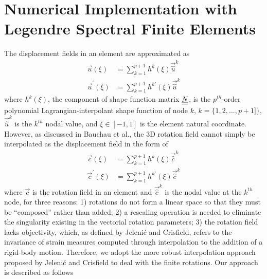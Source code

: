 \section{Numerical Implementation with Legendre Spectral Finite Elements}
The displacement fields in an element are approximated as
\begin{align}
    \label{InterpolateDisp}
    \vec{u}(\xi) &= \sum_{k=1}^{p+1} h^k(\xi) \vec{\hat{u}}^k \\
    \label{InterpolateDispp}
    \vec{u}^\prime(\xi) &= \sum_{k=1}^{p+1} h^{k\prime}(\xi) \vec{\hat{u}}^k
\end{align}
where $h^k(\xi)$, the component of shape function matrix $\underline{\underline{N}}$, is the $p^{th}$-order polynomial
Lagrangian-interpolant shape function of node $k$, $k=\{1,2,...,p+1]\}$, 
$\vec{\hat{u}}^k$ is
the $k^{th}$ nodal value, and $\xi \in \left[-1,1\right]$ is the element
natural coordinate.
However, as discussed in Bauchau et al.\cite{Bauchau-etal:2008}, the 
3D rotation field cannot simply be interpolated as the displacement field in the form of
\begin{align}
    \label{InterpolateRot}
    \vec{c}(\xi) &= \sum_{k=1}^{p+1} h^k(\xi) \vec{\hat{c}}^k \\
    \label{InterpolateRotp}
    \vec{c}^\prime(\xi) &= \sum_{k=1}^{p+1} h^{k \prime}(\xi) \vec{\hat{c}}^k 
\end{align}    
where $\vec{c}$ is the rotation field in an element and $\vec{\hat{c}}^k$ is
the nodal value at the $k^{th}$ node, for three reasons: 1) rotations do not
form a linear space so that they must be  ``composed'' rather than added; 2)
a rescaling operation is needed to eliminate the singularity existing in the
vectorial rotation parameters; 3) the rotation field lacks objectivity,
which, as
defined by Jeleni\'c and Crisfield\cite{Crisfield1999}, refers to the
invariance of strain measures computed through interpolation to the addition
of a rigid-body motion. Therefore, we adopt the more robust interpolation
approach proposed by Jeleni\'c and Crisfield\cite{Crisfield1999} to deal
with the finite rotations. Our approach is described as follows
